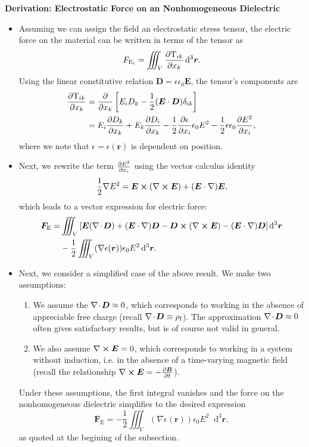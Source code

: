 \documentclass[11pt, a4paper]{article}
\newcommand{\diff}{\mathop{}\!\mathrm{d}} %
\newcommand{\dr}{\diff^{3} \r}  %
\renewcommand{\vec}[1]{\bm{#1}} %
\renewcommand{\r}{\vec{r}}
\newcommand{\E}{\vec{E}} %
\newcommand{\D}{\vec{D}}  %
\newcommand{\B}{\vec{B}} %
\newcommand{\TT}{\mathrm{T}}  %
\newcommand{\e}{\epsilon}
\newcommand{\ee}{\epsilon_{0}}  %
\renewcommand{\div}{\nabla \mspace{-2mu} \cdot \mspace{-2mu}}
\renewcommand{\curl}{\nabla \cross}
\renewcommand{\grad}{\nabla}
\begin{document}
\textbf{Derivation: Electrostatic Force on an Nonhomogeneous Dielectric}
\begin{itemize}

    \item Assuming we can assign the field an electrostatic stress tensor, the electric force on the material can be written in terms of the tensor as
	\begin{equation*}
		F_{\text{E}_{i}} = \iiint_{V}\pdv{\TT_{ik}}{x_{k}} \dr.
	\end{equation*}
	 Using the linear constitutive relation $ \D = \e \ee \E $, the tensor's components are
	\begin{align*}
        \pdv{\TT_{ik}}{x_{k}} &= \pdv{x_{k}} \left[ E_{i}D_{k} - \frac{1}{2}(\E \cdot \D) \delta_{ik}\right]\\
        &= E_{i}\pdv{D_{k}}{x_{k}} + E_{k}\pdv{D_{i}}{x_{k}} - \frac{1}{2}\pdv{\e}{x_{i}}\ee E^{2} - \frac{1}{2}\e \ee \pdv{E^{2}}{x_{i}},
	\end{align*}
    where we note that $ \e = \e(\r) $ is dependent on position.
	
    \item Next, we rewrite the term $ \pdv{E^{2}}{x_{i}} $ using the vector calculus identity
	\begin{equation*}
		\frac{1}{2}\grad E^{2} = \E \cross (\curl \E) + (\E \cdot \grad)\E,
	\end{equation*}
	which leads to a vector expression for electric force:
	\begin{align*}
		\vec{F}_{\text{E}} = &\iiint_{V}\left[\E (\div \D) + (\E \cdot \grad )\D - \D \cross (\curl \E) - (\E \cdot \grad )\D\right] \dr\\
		& - \frac{1}{2}\iiint_{V}(\grad \e(\r))\ee E^{2}\dr.
	\end{align*}
	
	\item Next, we consider a simplified case of the above result. We make two assumptions:
    \begin{enumerate}
        \item We assume the $ \div \D \approx 0 $, which corresponds to working in the absence of appreciable free charge (recall $ \div \D \equiv \rho_{\text{f}} $). The approximation $ \div \D \approx 0 $ often gives satisfactory results, but is of course not valid in general.
        
        \item We also assume $ \curl \E = 0 $, which corresponds to working in a system without induction, i.e. in the absence of a time-varying magnetic field (recall the relationship $ \curl \E = - \pdv{\B}{t} $).
    \end{enumerate}
    Under these assumptions, the first integral vanishes and the force on the nonhomogeneous dielectric simplifies to the desired expression
	\begin{equation*}
		\vec{F}_{\text{E}} = - \frac{1}{2}\iiint_{V}(\grad \e(\r))\ee E^{2}\dr,
	\end{equation*}
    as quoted at the begining of the subsection.
	
\end{itemize}
\end{document}
